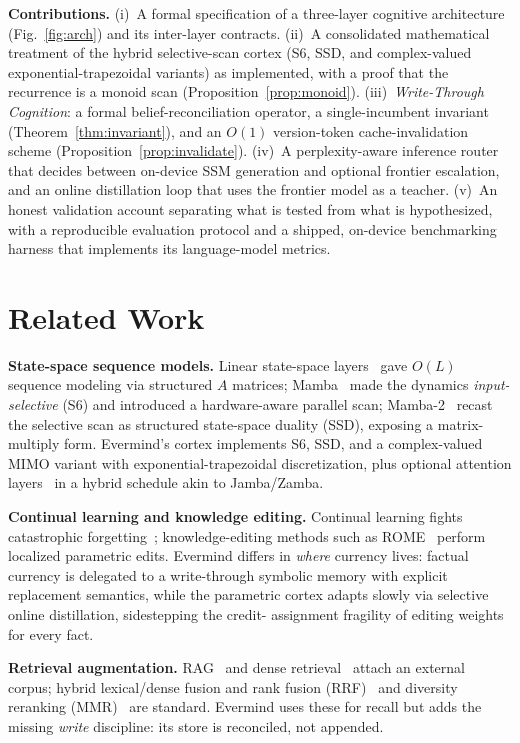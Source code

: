 \documentclass[journal,onecolumn,11pt]{IEEEtran}
\begin{document}
\textbf{Contributions.}
(i)~A formal specification of a three-layer cognitive architecture
(Fig.~\ref{fig:arch}) and its inter-layer contracts.
(ii)~A consolidated mathematical treatment of the hybrid selective-scan cortex
(S6, SSD, and complex-valued exponential-trapezoidal variants) as implemented,
with a proof that the recurrence is a monoid scan
(Proposition~\ref{prop:monoid}).
(iii)~\emph{Write-Through Cognition}: a formal belief-reconciliation operator,
a single-incumbent invariant (Theorem~\ref{thm:invariant}), and an $O(1)$
version-token cache-invalidation scheme (Proposition~\ref{prop:invalidate}).
(iv)~A perplexity-aware inference router that decides between on-device SSM
generation and optional frontier escalation, and an online distillation loop
that uses the frontier model as a teacher.
(v)~An honest validation account separating what is tested from what is
hypothesized, with a reproducible evaluation protocol and a shipped, on-device
benchmarking harness that implements its language-model metrics.

\section{Related Work}
\textbf{State-space sequence models.} Linear state-space layers~\cite{gu2022s4}
gave $O(L)$ sequence modeling via structured $A$ matrices; Mamba~\cite{gu2023mamba}
made the dynamics \emph{input-selective} (S6) and introduced a hardware-aware
parallel scan; Mamba-2~\cite{dao2024mamba2} recast the selective scan as
structured state-space duality (SSD), exposing a matrix-multiply form. Evermind's
cortex implements S6, SSD, and a complex-valued MIMO variant with
exponential-trapezoidal discretization, plus optional attention
layers~\cite{vaswani2017} in a hybrid schedule akin to Jamba/Zamba.

\textbf{Continual learning and knowledge editing.} Continual learning fights
catastrophic forgetting~\cite{kirkpatrick2017ewc}; knowledge-editing methods such
as ROME~\cite{meng2022rome} perform localized parametric edits. Evermind differs
in \emph{where} currency lives: factual currency is delegated to a write-through
symbolic memory with explicit replacement semantics, while the parametric cortex
adapts slowly via selective online distillation, sidestepping the credit-
assignment fragility of editing weights for every fact.

\textbf{Retrieval augmentation.} RAG~\cite{lewis2020} and dense
retrieval~\cite{karpukhin2020dpr} attach an external corpus; hybrid lexical/dense
fusion and rank fusion (RRF)~\cite{cormack2009rrf} and diversity reranking
(MMR)~\cite{carbonell1998mmr} are standard. Evermind uses these for recall but
adds the missing \emph{write} discipline: its store is reconciled, not appended.
\end{document}
